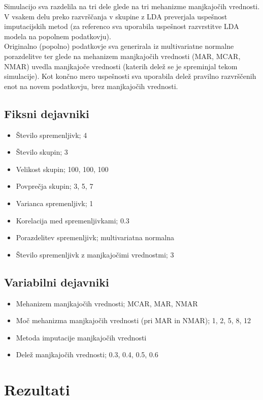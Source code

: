 \documentclass[12pt,a4paper]{article}
\begin{document}
Simulacijo sva razdelila na tri dele glede na tri mehanizme manjkajočih vrednosti. V vsakem delu preko razvrščanja v skupine z LDA preverjala uspešnost imputacijskih metod (za referenco sva uporabila uspešnost razvrstitve LDA modela na popolnem podatkovju).\\
Originalno (popolno) podatkovje sva generirala iz multivariatne normalne porazdelitve ter glede na mehanizem manjkajočih vrednosti (MAR, MCAR, NMAR) uvedla manjkajoče vrednosti (katerih delež se je spreminjal tekom simulacije). Kot končno mero uspešnosti sva uporabila delež pravilno razvrščenih enot na novem podatkovju, brez manjkajočih vrednosti.

\subsection{Fiksni dejavniki}
\begin{itemize}
    \item Število spremenljivk; 4
    \item Število skupin; 3
    \item Velikost skupin; 100, 100, 100
    \item Povprečja skupin; 3, 5, 7
    \item Varianca spremenljivk; 1
    \item Korelacija med spremenljivkami; 0.3
    \item Porazdelitev spremenljivk; multivariatna normalna
    \item Število spremenljivk z manjkajočimi vrednostmi; 3
\end{itemize}   


\subsection{Variabilni dejavniki}
\begin{itemize}
    \item Mehanizem manjkajočih vrednosti; MCAR, MAR, NMAR
    \item Moč mehanizma manjkajočih vrednosti (pri MAR in NMAR); 1, 2, 5, 8, 12
    \item Metoda imputacije manjkajočih vrednosti
    \item Delež manjkajočih vrednosti; 0.3, 0.4, 0.5, 0.6
\end{itemize}

\pagebreak

\section{Rezultati}
\end{document}
